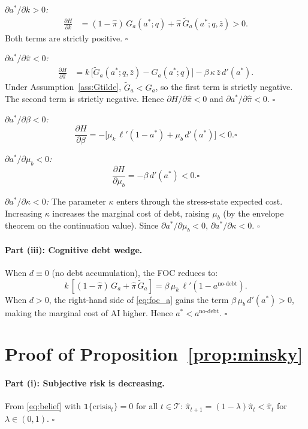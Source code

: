 \documentclass[12pt]{article}
\newcommand{\hpi}{\hat{\pi}}
\begin{document}
\textit{$\partial a^* / \partial k > 0$:}
\begin{align}
\frac{\partial H}{\partial k} &= (1-\hpi)\,G_a(a^*;q) + \hpi\,\tilde{G}_a(a^*;q,\bar{z}) > 0.
\end{align}
Both terms are strictly positive. $\square$

\textit{$\partial a^* / \partial \hpi < 0$:}
\begin{align}
\frac{\partial H}{\partial \hpi} &= k\,\bigl[\tilde{G}_a(a^*;q,\bar{z}) - G_a(a^*;q)\bigr] - \beta\,\kappa\,\bar{z}\,d'(a^*).
\end{align}
Under Assumption~\ref{ass:Gtilde}, $\tilde{G}_a < G_a$, so the first term is strictly
negative. The second term is strictly negative. Hence $\partial H / \partial \hpi < 0$
and $\partial a^* / \partial \hpi < 0$. $\square$

\textit{$\partial a^* / \partial \beta < 0$:}
\[
\frac{\partial H}{\partial \beta} = -\bigl[\mu_k\,\ell'(1-a^*) + \mu_b\,d'(a^*)\bigr] < 0. \square
\]

\textit{$\partial a^* / \partial \mu_b < 0$:}
\[
\frac{\partial H}{\partial \mu_b} = -\beta\,d'(a^*) < 0. \square
\]

\textit{$\partial a^* / \partial \kappa < 0$:}
The parameter $\kappa$ enters through the stress-state expected cost. Increasing
$\kappa$ increases the marginal cost of debt, raising $\mu_b$ (by the envelope
theorem on the continuation value). Since $\partial a^* / \partial \mu_b < 0$,
$\partial a^* / \partial \kappa < 0$. $\square$

\paragraph{Part (iii): Cognitive debt wedge.}

When $d \equiv 0$ (no debt accumulation), the FOC reduces to:
\[
k\,[(1-\hpi)\,G_a + \hpi\,\tilde{G}_a] = \beta\,\mu_k\,\ell'(1-a^{\text{no-debt}}).
\]
When $d > 0$, the right-hand side of \eqref{eq:foc_a} gains the term
$\beta\,\mu_b\,d'(a^*) > 0$, making the marginal cost of AI higher.
Hence $a^* < a^{\text{no-debt}}$. $\square$

\section{Proof of Proposition~\ref{prop:minsky}}
\label{app:prop2}

\paragraph{Part (i): Subjective risk is decreasing.}
From \eqref{eq:belief} with $\mathbf{1}\{\text{crisis}_t\} = 0$ for all $t \in \mathcal{T}$:
$\hpi_{t+1} = (1-\lambda)\hpi_t < \hpi_t$ for $\lambda \in (0,1)$. $\square$
\end{document}
